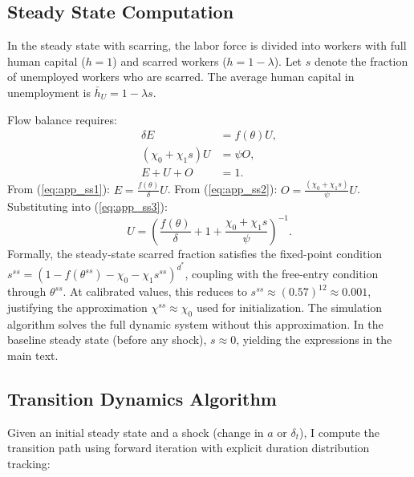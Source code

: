 \documentclass[12pt]{article}
\begin{document}
\subsection{Steady State Computation}

In the steady state with scarring, the labor force is divided into workers with full human capital ($h = 1$) and scarred workers ($h = 1 - \lambda$). Let $s$ denote the fraction of unemployed workers who are scarred. The average human capital in unemployment is $\bar{h}_U = 1 - \lambda s$.

Flow balance requires:
\begin{align}
\delta E &= f(\theta) U, \label{eq:app_ss1} \\
(\chi_0 + \chi_1 s) U &= \psi O, \label{eq:app_ss2} \\
E + U + O &= 1. \label{eq:app_ss3}
\end{align}
From (\ref{eq:app_ss1}): $E = \frac{f(\theta)}{\delta} U$. From (\ref{eq:app_ss2}): $O = \frac{(\chi_0 + \chi_1 s)}{\psi} U$. Substituting into (\ref{eq:app_ss3}):
\begin{equation}
U = \left( \frac{f(\theta)}{\delta} + 1 + \frac{\chi_0 + \chi_1 s}{\psi} \right)^{-1}.
\label{eq:app_U_ss}
\end{equation}
Formally, the steady-state scarred fraction satisfies the fixed-point condition $s^{ss} = (1 - f(\theta^{ss}) - \chi_0 - \chi_1 s^{ss})^{d^*}$, coupling with the free-entry condition through $\theta^{ss}$. At calibrated values, this reduces to $s^{ss} \approx (0.57)^{12} \approx 0.001$, justifying the approximation $\chi^{ss} \approx \chi_0$ used for initialization. The simulation algorithm solves the full dynamic system without this approximation. In the baseline steady state (before any shock), $s \approx 0$, yielding the expressions in the main text.

\subsection{Transition Dynamics Algorithm}

Given an initial steady state and a shock (change in $a$ or $\delta_t$), I compute the transition path using forward iteration with explicit duration distribution tracking:
\end{document}
